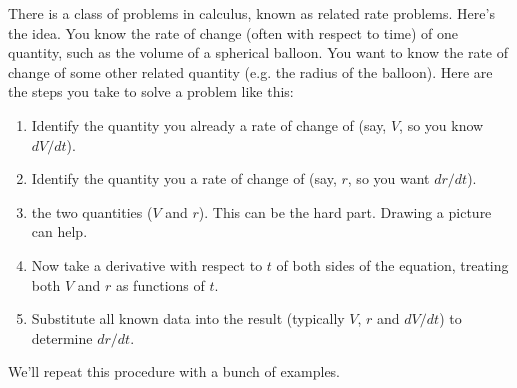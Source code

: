 \documentclass[11pt,fleqn]{article}
\begin{document}
\setlength{\parindent}{0cm}
\renewcommand{\headrulewidth}{0pt}
\newcommand{\blank}[1]{\rule{#1}{0.75pt}}
\renewcommand{\d}{\displaystyle}
\vspace*{-0.7in}
\begin{center}
 {\large{ }}
\end{center}
 	
There is a class of problems in calculus, known as related rate problems.
Here's the idea.  You know the rate of change (often with respect to time)
of one quantity, such as the volume of a spherical balloon.  
You want to know the rate of
change of some other related quantity (e.g. the radius of the balloon).  
Here are the steps you take to solve a problem like this:
\begin{enumerate}
\item Identify the quantity you already  a rate of change of (say, $V$, so 
you know $dV/dt$).
\item Identify the quantity you  a rate of change of (say, $r$, so you want $dr/dt$).
\item {} the two quantities ($V$ and $r$). This can be the hard part.  Drawing a picture can help.
\item Now take a derivative with respect to $t$ 
of both sides of the equation, treating both $V$ and $r$ as functions of $t$.
\item Substitute all known data into the result (typically $V$, $r$ and $dV/dt$) to determine $dr/dt$.
\end{enumerate}
We'll repeat this procedure with a bunch of examples.
\end{document}
